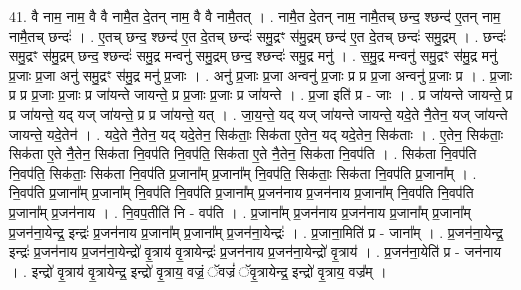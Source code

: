 \documentclass[17pt]{extarticle}
\begin{document}
41. वै नाम॒ नाम॒ वै वै नामै॒त दे॒तन् नाम॒ वै वै नामै॒तत् । . नामै॒त दे॒तन् नाम॒ नामै॒तच् छन्द॒ श्छन्द॑ ए॒तन् नाम॒ नामै॒तच् छन्दः॑ । . ए॒तच् छन्द॒ श्छन्द॑ ए॒त दे॒तच् छन्दः॑ समु॒द्रꣳ स॑मु॒द्रम् छन्द॑ ए॒त दे॒तच् छन्दः॑ समु॒द्रम् । . छन्दः॑ समु॒द्रꣳ स॑मु॒द्रम् छन्द॒ श्छन्दः॑ समु॒द्र मन्वनु॑ समु॒द्रम् छन्द॒ श्छन्दः॑ समु॒द्र मनु॑ । . स॒मु॒द्र मन्वनु॑ समु॒द्रꣳ स॑मु॒द्र मनु॑ प्र॒जाः प्र॒जा अनु॑ समु॒द्रꣳ स॑मु॒द्र मनु॑ प्र॒जाः । . अनु॑ प्र॒जाः प्र॒जा अन्वनु॑ प्र॒जाः प्र प्र प्र॒जा अन्वनु॑ प्र॒जाः प्र । . प्र॒जाः प्र प्र प्र॒जाः प्र॒जाः प्र जा॑यन्ते जायन्ते॒ प्र प्र॒जाः प्र॒जाः प्र जा॑यन्ते । . प्र॒जा इति॑ प्र - जाः । . प्र जा॑यन्ते जायन्ते॒ प्र प्र जा॑यन्ते॒ यद् यज् जा॑यन्ते॒ प्र प्र जा॑यन्ते॒ यत् । . जा॒य॒न्ते॒ यद् यज् जा॑यन्ते जायन्ते॒ यदे॒ते नै॒तेन॒ यज् जा॑यन्ते जायन्ते॒ यदे॒तेन॑ । . यदे॒ते नै॒तेन॒ यद् यदे॒तेन॒ सिक॑ताः॒ सिक॑ता ए॒तेन॒ यद् यदे॒तेन॒ सिक॑ताः । . ए॒तेन॒ सिक॑ताः॒ सिक॑ता ए॒ते नै॒तेन॒ सिक॑ता नि॒वप॑ति नि॒वप॑ति॒ सिक॑ता ए॒ते नै॒तेन॒ सिक॑ता नि॒वप॑ति । . सिक॑ता नि॒वप॑ति नि॒वप॑ति॒ सिक॑ताः॒ सिक॑ता नि॒वप॑ति प्र॒जाना᳚म् प्र॒जाना᳚म् नि॒वप॑ति॒ सिक॑ताः॒ सिक॑ता नि॒वप॑ति प्र॒जाना᳚म् । . नि॒वप॑ति प्र॒जाना᳚म् प्र॒जाना᳚म् नि॒वप॑ति नि॒वप॑ति प्र॒जाना᳚म् प्र॒जन॑नाय प्र॒जन॑नाय प्र॒जाना᳚म् नि॒वप॑ति नि॒वप॑ति प्र॒जाना᳚म् प्र॒जन॑नाय । . नि॒वप॒तीति॑ नि - वप॑ति । . प्र॒जाना᳚म् प्र॒जन॑नाय प्र॒जन॑नाय प्र॒जाना᳚म् प्र॒जाना᳚म् प्र॒जन॑ना॒येन्द्र॒ इन्द्रः॑ प्र॒जन॑नाय प्र॒जाना᳚म् प्र॒जाना᳚म् प्र॒जन॑ना॒येन्द्रः॑ । . प्र॒जाना॒मिति॑ प्र - जाना᳚म् । . प्र॒जन॑ना॒येन्द्र॒ इन्द्रः॑ प्र॒जन॑नाय प्र॒जन॑ना॒येन्द्रो॑ वृ॒त्राय॑ वृ॒त्रायेन्द्रः॑ प्र॒जन॑नाय प्र॒जन॑ना॒येन्द्रो॑ वृ॒त्राय॑ । . प्र॒जन॑ना॒येति॑ प्र - जन॑नाय । . इन्द्रो॑ वृ॒त्राय॑ वृ॒त्रायेन्द्र॒ इन्द्रो॑ वृ॒त्राय॒ वज्रं॒ ॅवज्रं॑ ॅवृ॒त्रायेन्द्र॒ इन्द्रो॑ वृ॒त्राय॒ वज्र᳚म् । \newline
\pagebreak
{}
\end{document}
